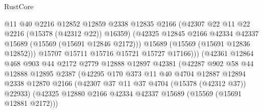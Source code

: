 \begin{lexlean}{RustCore}
\begin{coremodule}
                                    @11
                                    @40
                                    @2216
                                    @12852
                                    @12859
                                    @2338
                                    @12835
                                    @2166
                                    (@42307 @22 @11 @22 @2216 (@15378 (@42312 @22)) @16359)
                                    (@42325
                                      @12845
                                      @2166
                                      @42334
                                      @42337
                                      @15689
                                      (@15569 (@15691 @12846 @2172)))
                                    @15689
                                    (@15569 (@15691 @12836 @12852)))
                                  @15707
                                  @15711
                                  @15716
                                  @15721
                                  @15727
                                  @17166)))
                            (@42361
                              @12864
                              @468
                              @903
                              @44
                              @2172
                              @2779
                              @12888
                              @12897
                              @42381
                              (@42287
                                @902
                                @58
                                @44
                                @12888
                                @12895
                                @2387
                                (@42295
                                  @170
                                  @373
                                  @11
                                  @40
                                  @4704
                                  @12887
                                  @12894
                                  @2338
                                  @12870
                                  @2166
                                  (@42307 @37 @11 @37 @4704 (@15378 (@42312 @37)) @22933)
                                  (@42325
                                    @12880
                                    @2166
                                    @42334
                                    @42337
                                    @15689
                                    (@15569 (@15691 @12881 @2172)))

\end{coremodule}
\end{lexlean}
